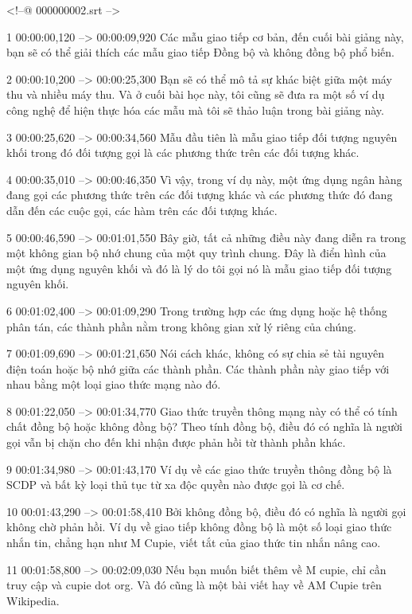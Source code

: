 <!--@ 000000002.srt -->

1
00:00:00,120 --> 00:00:09,920
Các mẫu giao tiếp cơ bản, đến cuối bài giảng này, bạn sẽ có thể giải thích các mẫu giao tiếp Đồng bộ và không đồng bộ phổ biến.

2
00:00:10,200 --> 00:00:25,300
Bạn sẽ có thể mô tả sự khác biệt giữa một máy thu và nhiều máy thu.  Và ở cuối bài học này, tôi cũng sẽ đưa ra một số ví dụ công nghệ để hiện thực hóa các mẫu mà tôi sẽ thảo luận trong bài giảng này.

3
00:00:25,620 --> 00:00:34,560
Mẫu đầu tiên là mẫu giao tiếp đối tượng nguyên khối trong đó đối tượng gọi là các phương thức trên các đối tượng khác.

4
00:00:35,010 --> 00:00:46,350
Vì vậy, trong ví dụ này, một ứng dụng ngân hàng đang gọi các phương thức trên các đối tượng khác và các phương thức đó đang dẫn đến các cuộc gọi, các hàm trên các đối tượng khác.

5
00:00:46,590 --> 00:01:01,550
Bây giờ, tất cả những điều này đang diễn ra trong một không gian bộ nhớ chung của một quy trình chung.  Đây là điển hình của một ứng dụng nguyên khối và đó là lý do tôi gọi nó là mẫu giao tiếp đối tượng nguyên khối.

6
00:01:02,400 --> 00:01:09,290
Trong trường hợp các ứng dụng hoặc hệ thống phân tán, các thành phần nằm trong không gian xử lý riêng của chúng.

7
00:01:09,690 --> 00:01:21,650
Nói cách khác, không có sự chia sẻ tài nguyên điện toán hoặc bộ nhớ giữa các thành phần.  Các thành phần này giao tiếp với nhau bằng một loại giao thức mạng nào đó.

8
00:01:22,050 --> 00:01:34,770
Giao thức truyền thông mạng này có thể có tính chất đồng bộ hoặc không đồng bộ?  Theo tính đồng bộ, điều đó có nghĩa là người gọi vẫn bị chặn cho đến khi nhận được phản hồi từ thành phần khác.

9
00:01:34,980 --> 00:01:43,170
Ví dụ về các giao thức truyền thông đồng bộ là SCDP và bất kỳ loại thủ tục từ xa độc quyền nào được gọi là cơ chế.

10
00:01:43,290 --> 00:01:58,410
Bởi không đồng bộ, điều đó có nghĩa là người gọi không chờ phản hồi.  Ví dụ về giao tiếp không đồng bộ là một số loại giao thức nhắn tin, chẳng hạn như M Cupie, viết tắt của giao thức tin nhắn nâng cao.

11
00:01:58,800 --> 00:02:09,030
Nếu bạn muốn biết thêm về M cupie, chỉ cần truy cập và cupie dot org.  Và đó cũng là một bài viết hay về AM Cupie trên Wikipedia.

